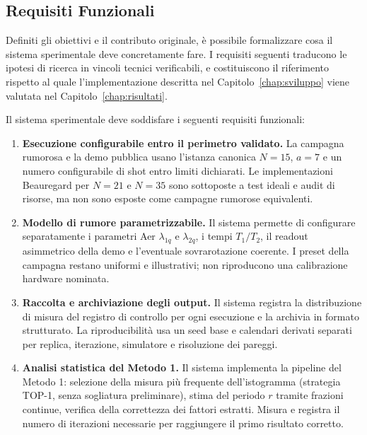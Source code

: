 \begin{onehalfspace}
\subsection{Requisiti Funzionali}
\label{sec:requisiti}

Definiti gli obiettivi e il contributo originale, è possibile formalizzare cosa il sistema sperimentale deve concretamente fare. I requisiti seguenti traducono le ipotesi di ricerca in vincoli tecnici verificabili, e costituiscono il riferimento rispetto al quale l'implementazione descritta nel Capitolo~\ref{chap:sviluppo} viene valutata nel Capitolo~\ref{chap:risultati}.

Il sistema sperimentale deve soddisfare i seguenti requisiti funzionali:

\begin{enumerate}

    \item \textbf{Esecuzione configurabile entro il perimetro validato.}
    La campagna rumorosa e la demo pubblica usano l'istanza canonica $N=15$, $a=7$ e un numero configurabile di shot entro limiti dichiarati. Le implementazioni Beauregard per $N=21$ e $N=35$ sono sottoposte a test ideali e audit di risorse, ma non sono esposte come campagne rumorose equivalenti.

    \item \textbf{Modello di rumore parametrizzabile.}
    Il sistema permette di configurare separatamente i parametri Aer $\lambda_{1q}$ e $\lambda_{2q}$, i tempi $T_1/T_2$, il readout asimmetrico della demo e l'eventuale sovrarotazione coerente. I preset della campagna restano uniformi e illustrativi; non riproducono una calibrazione hardware nominata.

    \item \textbf{Raccolta e archiviazione degli output.}
    Il sistema registra la distribuzione di misura del registro di controllo per ogni esecuzione e la archivia in formato strutturato. La riproducibilità usa un seed base e calendari derivati separati per replica, iterazione, simulatore e risoluzione dei pareggi.

    \item \textbf{Analisi statistica del Metodo 1.}
    Il sistema implementa la pipeline del Metodo 1: selezione della misura più frequente dell'istogramma (strategia TOP-1, senza sogliatura preliminare), stima del periodo $r$ tramite frazioni continue, verifica della correttezza dei fattori estratti. Misura e registra il numero di iterazioni necessarie per raggiungere il primo risultato corretto.


\end{enumerate}
\end{onehalfspace}
